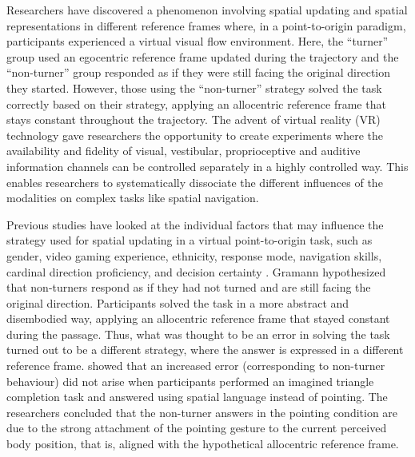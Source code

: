 \documentclass{frontiersSCNS} %
\begin{document}
Researchers have discovered a phenomenon involving spatial updating and spatial representations in different reference frames \citep{Klatzky1998} where, in a point-to-origin paradigm, participants experienced a virtual visual flow environment. Here, the “turner” group used an egocentric reference frame updated during the trajectory and the “non-turner” group responded as if they were still facing the original direction they started. However, those using the “non-turner” strategy solved the task correctly based on their strategy, applying an allocentric reference frame that stays constant throughout the trajectory.
The advent of virtual reality (VR) technology gave researchers the opportunity to create experiments where the availability and fidelity of visual, vestibular, proprioceptive and auditive information channels can be controlled separately in a highly controlled way. This enables researchers to systematically dissociate the different influences of the modalities on complex tasks like spatial navigation.

Previous studies have looked at the individual factors that may influence the strategy used for spatial updating in a virtual point-to-origin task, such as gender, video gaming experience, ethnicity, response mode, navigation skills, cardinal direction proficiency, and decision certainty \citep{Goeke2013,Avraamides2004,Riecke2008}. 
Gramann hypothesized that non-turners respond as if they had not turned and are still facing the original direction. Participants solved the task in a more abstract and disembodied way, applying an allocentric reference frame that stayed constant during the passage. Thus, what was thought to be an error in solving the task turned out to be a different strategy, where the answer is expressed in a different reference frame.
\citep{Avraamides2004} showed that an increased error (corresponding to non-turner behaviour) did not arise when participants performed an imagined triangle completion task and answered using spatial language instead of pointing. The researchers concluded that the non-turner answers in the pointing condition are due to the strong attachment of the pointing gesture to the current perceived body position, that is,  aligned with the hypothetical allocentric reference frame. 
\end{document}

